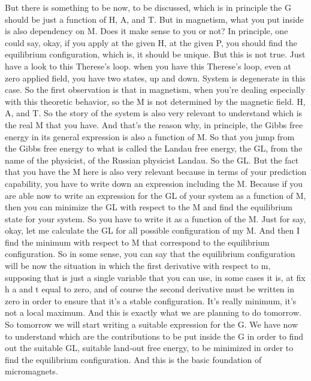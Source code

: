 But there is something to be now, to be discussed, which is in principle the G should be just a function of H, A, and T. But in magnetism, what you put inside is also dependency on M. Does it make sense to you or not? In principle, one could say, okay, if you apply at the given H, at the given P, you should find the equilibrium configuration, which is, it should be unique. But this is not true. Just have a look to this Therese's loop. when you have this Therese's loop, even at zero applied field, you have two states, up and down. System is degenerate in this case. So the first observation is that in magnetism, when you're dealing especially with this theoretic behavior, so the M is not determined by the magnetic field. H, A, and T. So the story of the system is also very relevant to understand which is the real M that you have. And that's the reason why, in principle, the Gibbs free energy in its general expression is also a function of M. So that you jump from the Gibbs free energy to what is called the Landau free energy, the GL, from the name of the physicist, of the Russian physicist Landau. So the GL. But the fact that you have the M here is also very relevant because in terms of your prediction capability, you have to write down an expression including the M. Because if you are able now to write an expression for the GL of your system as a function of M, then you can minimize the GL with respect to the M and find the equilibrium state for your system. So you have to write it as a function of the M. Just for say, okay, let me calculate the GL for all possible configuration of my M. And then I find the minimum with respect to M that correspond to the equilibrium configuration. So in some sense, you can say that the equilibrium configuration will be now the situation in which the first derivative with respect to m, supposing that is just a single variable that you can use, in some cases it is, at fix h a and t equal to zero, and of course the second derivative must be written in zero in order to ensure that it's a stable configuration. It's really minimum, it's not a local maximum. And this is exactly what we are planning to do tomorrow. So tomorrow we will start writing a suitable expression for the G. We have now to understand which are the contributions to be put inside the G in order to find out the suitable GL, suitable land-out free energy, to be minimized in order to find the equilibrium configuration. And this is the basic foundation of micromagnets.\\
